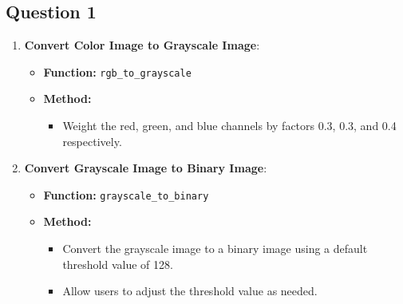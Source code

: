 \documentclass{article}
\begin{document}
\subsection{Question 1}
\begin{enumerate}
    \item \textbf{Convert Color Image to Grayscale Image}:
    \begin{itemize}
        \item \textbf{Function:} \texttt{rgb\_to\_grayscale}
        \item \textbf{Method:}
        \begin{itemize}
            \item Weight the red, green, and blue channels by factors 0.3, 0.3, and 0.4 respectively.
        \end{itemize}
    \end{itemize}
    
    \item \textbf{Convert Grayscale Image to Binary Image}:
    \begin{itemize}
        \item \textbf{Function:} \texttt{grayscale\_to\_binary}
        \item \textbf{Method:}
        \begin{itemize}
            \item Convert the grayscale image to a binary image using a default threshold value of 128.
            \item Allow users to adjust the threshold value as needed.
        \end{itemize}
    \end{itemize}
    

\end{enumerate}
\end{document}
